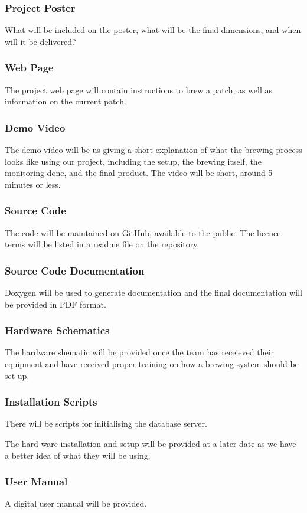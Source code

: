 \subsubsection{Project Poster}
What will be included on the poster, what will be the final dimensions, and when will it be delivered?

\subsubsection{Web Page}

The project web page will contain instructions to brew a patch, as well as information on the current patch.

\subsubsection{Demo Video}
The demo video will be us giving a short explanation of what the brewing process looks like using our project, including the setup, the brewing itself, the monitoring done, and the final product. The video will be short, around 5 minutes or less.

\subsubsection{Source Code}

The code will be maintained on GitHub, available to the public. The licence terms will be listed in a readme file on the repository.

\subsubsection{Source Code Documentation}


Doxygen will be used to generate documentation and the final documentation will be provided in PDF format.

\subsubsection{Hardware Schematics}
The hardware shematic will be provided once the team has receieved their equipment and have received proper training on how a brewing system should be set up. 



\subsubsection{Installation Scripts}
There will be scripts for initialising the database server. 

The hard ware installation and setup will be provided at a later date as we have a better idea of what they will be using.


\subsubsection{User Manual}

A digital user manual will be provided.
